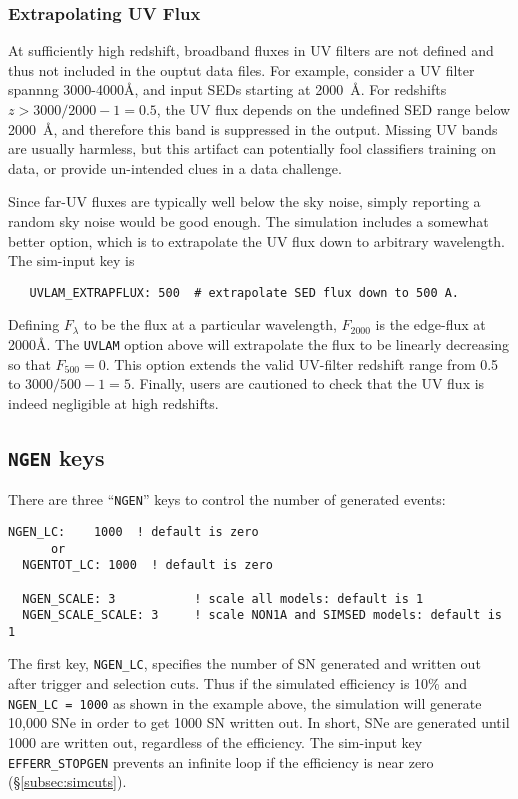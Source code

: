 \documentclass[12pt]{article}
\begin{document}
\subsubsection{Extrapolating UV Flux}
\label{sss:UVLAM_EXTRAP}

At sufficiently high redshift, broadband fluxes in UV filters 
are not defined and thus not included in the ouptut data files.
For example, consider a UV filter spannng 3000-4000\AA,
and input SEDs starting at 2000~\AA. 
For redshifts $z> 3000/2000-1 = 0.5$, the UV flux depends
on the undefined SED range  below 2000~\AA, and therefore
this band is suppressed in the output. Missing UV bands are
usually harmless, but this artifact can potentially fool
classifiers training on data, or provide un-intended clues
in a data challenge.  

Since far-UV fluxes are typically well below the sky noise,
simply reporting a random sky noise would be good enough.
The simulation includes a somewhat better option,
which is to extrapolate the UV flux down to arbitrary
wavelength. The sim-input key is
\begin{verbatim}
   UVLAM_EXTRAPFLUX: 500  # extrapolate SED flux down to 500 A.
\end{verbatim}
%
\newcommand{\FLUXLAM}{F_{\lambda}}
\newcommand{\FLUXedge}{F_{2000}}
\newcommand{\FLUXEXTRAP}{F_{500}}
%
Defining $\FLUXLAM$ to be the flux at a particular wavelength,
$\FLUXedge$ is the edge-flux at 2000\AA. The {\tt UVLAM} option 
above will extrapolate the flux
to be linearly decreasing so that $\FLUXEXTRAP=0$.
This option extends the valid UV-filter redshift range from 0.5 to
$3000/500-1 = 5$.
Finally, users are cautioned to check that the UV flux is indeed
negligible at high redshifts.


\clearpage
   \subsection{{\tt NGEN} keys}
   \label{subsec:NGEN}

There are three ``{\tt NGEN}'' keys to control the number
of generated events:

\begin{Verbatim}[frame=single]
  NGEN_LC:    1000  ! default is zero
      or
  NGENTOT_LC: 1000  ! default is zero

  NGEN_SCALE: 3           ! scale all models: default is 1
  NGEN_SCALE_SCALE: 3     ! scale NON1A and SIMSED models: default is 1
\end{Verbatim}
%
The first key, {\tt NGEN\_LC}, specifies the number of SN generated
and written out after trigger and selection cuts. Thus if the simulated
efficiency is 10\% and {\tt NGEN\_LC = 1000} as shown in the example
above, the simulation will generate 10,000 SNe in order to get 1000
SN written out. In short, SNe are generated until 1000 are written out,
regardless of the efficiency.
The sim-input key {\tt EFFERR\_STOPGEN} prevents an infinite 
loop if the efficiency is near zero (\S\ref{subsec:simcuts}).
   
\end{document}
